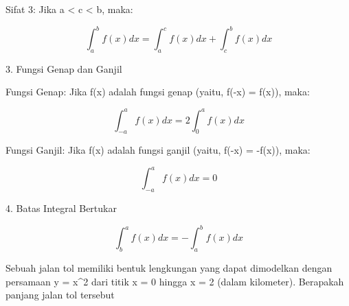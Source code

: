 \documentclass[a4paper,10pt]{article}
\begin{document}
\begin{eulernotebook}
\begin{eulercomment}
\begin{eulercomment}
\begin{eulercomment}
\begin{eulercomment}
\begin{eulercomment}
Sifat 3: Jika a \textless{} c \textless{} b, maka:\\
\end{eulercomment}
\begin{eulerformula}
\[
\int_a^b f(x) dx = \int_a^c f(x) dx + \int_c^b f(x) dx
\]
\end{eulerformula}
\begin{eulercomment}
3. Fungsi Genap dan Ganjil

Fungsi Genap: Jika f(x) adalah fungsi genap (yaitu, f(-x) = f(x)),
maka:\\
\end{eulercomment}
\begin{eulerformula}
\[
\int_{-a}^a f(x) dx = 2 \int_0^a f(x) dx
\]
\end{eulerformula}
\begin{eulercomment}
Fungsi Ganjil: Jika f(x) adalah fungsi ganjil (yaitu, f(-x) = -f(x)),
maka:\\
\end{eulercomment}
\begin{eulerformula}
\[
\int_{-a}^a f(x) dx = 0
\]
\end{eulerformula}
\begin{eulercomment}
4. Batas Integral Bertukar\\
\end{eulercomment}
\begin{eulerformula}
\[
\int_b^a f(x) dx = -\int_a^b f(x) dx
\]
\end{eulerformula}
\begin{eulercomment}
\end{eulercomment}
\begin{eulercomment}
Sebuah jalan tol memiliki bentuk lengkungan yang dapat dimodelkan
dengan persamaan y = x\textasciicircum{}2 dari titik x = 0 hingga x = 2 (dalam
kilometer). Berapakah panjang jalan tol tersebut


\end{eulercomment}
\end{eulercomment}
\end{eulercomment}
\end{eulercomment}
\end{eulercomment}
\end{eulernotebook}
\end{document}
